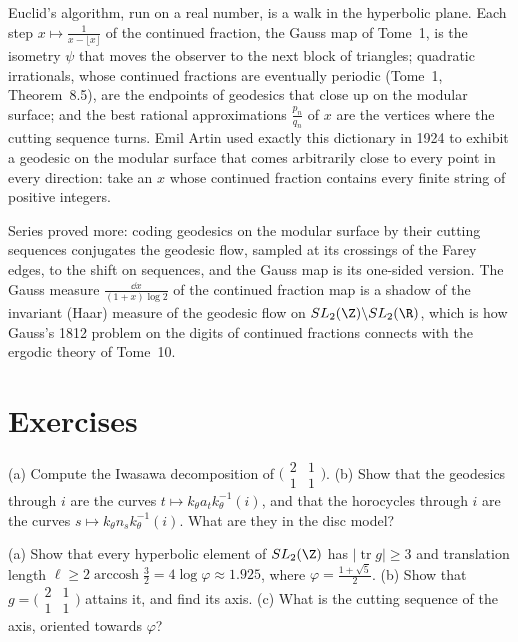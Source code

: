 \begin{beauty}
Euclid's algorithm, run on a real number, is a walk in the hyperbolic plane. Each step $x\mapsto\frac1{x-\lfloor x\rfloor}$ of the continued fraction, the Gauss map of Tome~1, is the isometry $\psi$ that
moves the observer to the next block of triangles; quadratic irrationals, whose continued fractions are eventually periodic (Tome~1, Theorem~8.5), are the endpoints of geodesics that close up on
the modular surface; and the best rational approximations $\frac{p_n}{q_n}$ of $x$ are the vertices where the cutting sequence turns. Emil Artin used exactly this dictionary in 1924 to exhibit a
geodesic on the modular surface that comes arbitrarily close to every point in every direction: take an $x$ whose continued fraction contains every finite string of positive integers.
\end{beauty}

\begin{remark}
Series proved more: coding geodesics on the modular surface by their cutting sequences conjugates the geodesic flow, sampled at its crossings of the Farey edges, to the shift on sequences, and
the Gauss map is its one-sided version. The Gauss measure $\frac{\dd x}{(1+x)\log2}$ of the continued fraction map is a shadow of the invariant (Haar) measure of the geodesic flow on
$SL_2(\Z)\backslash SL_2(\R)$, which is how Gauss's 1812 problem on the digits of continued fractions connects with the ergodic theory of Tome~10.
\end{remark}

\section{Exercises}

\begin{exercise}[$\star$]\label{ex:iwasawaexplicit}
(a) Compute the Iwasawa decomposition of $\bigl(\begin{smallmatrix}2&1\\1&1\end{smallmatrix}\bigr)$. (b) Show that the geodesics through $i$ are the curves $t\mapsto k_\theta a_tk_\theta^{-1}(i)$, and that the
horocycles through $i$ are the curves $s\mapsto k_\theta n_sk_\theta^{-1}(i)$. What are they in the disc model?
\end{exercise}

\begin{exercise}[$\star\star$]\label{ex:shortest}
(a) Show that every hyperbolic element of $SL_2(\Z)$ has $|\operatorname{tr}g|\ge3$ and translation length $\ell\ge2\operatorname{arccosh}\frac32=4\log\varphi\approx1.925$, where $\varphi=\frac{1+\sqrt5}2$.
(b) Show that $g=\bigl(\begin{smallmatrix}2&1\\1&1\end{smallmatrix}\bigr)$ attains it, and find its axis. (c) What is the cutting sequence of the axis, oriented towards $\varphi$?
\end{exercise}


